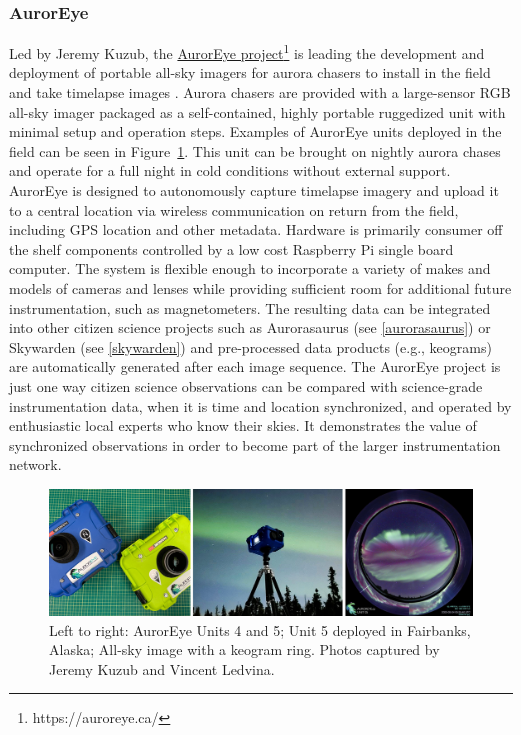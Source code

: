 \documentclass{article}
\renewcommand{\cite}[1]{\parencite{#1}}
\begin{document}
\subsubsection{AurorEye}

Led by Jeremy Kuzub, the \href{https://auroreye.ca/}{AurorEye project}\footnote{https://auroreye.ca/} is leading the development and deployment of portable all-sky imagers for aurora chasers to install in the field and take timelapse images \cite{Kuzub2022}. Aurora chasers are provided with a large-sensor RGB all-sky imager packaged as a self-contained, highly portable ruggedized unit with minimal setup and operation steps. Examples of AurorEye units deployed in the field can be seen in Figure~\ref{fig-auroraeye}. This unit can be brought on nightly aurora chases and operate for a full night in cold conditions without external support. AurorEye is designed to autonomously capture timelapse imagery and upload it to a central location via wireless communication on return from the field, including GPS location and other metadata. Hardware is primarily consumer off the shelf components controlled by a low cost Raspberry Pi single board computer. The system is flexible enough to incorporate a variety of makes and models of cameras and lenses while providing sufficient room for additional future instrumentation, such as magnetometers. The resulting data can be integrated into other citizen science projects such as Aurorasaurus (see \ref{aurorasaurus}) or Skywarden (see \ref{skywarden}) and pre-processed data products (e.g., keograms) are automatically generated after each image sequence. The AurorEye project is just one way citizen science observations can be compared with science-grade instrumentation data, when it is time and location synchronized, and operated by enthusiastic local experts who know their skies. It demonstrates the value of synchronized observations in order to become part of the larger instrumentation network. 

\begin{figure}
  \includegraphics[width=\linewidth]{Fig15_AurorEye.jpg}
  \caption{Left to right: AurorEye Units 4 and 5; Unit 5 deployed in Fairbanks, Alaska; All-sky image with a keogram ring. Photos captured by Jeremy Kuzub and Vincent Ledvina.}
  \label{fig-auroraeye}
\end{figure}
\end{document}
